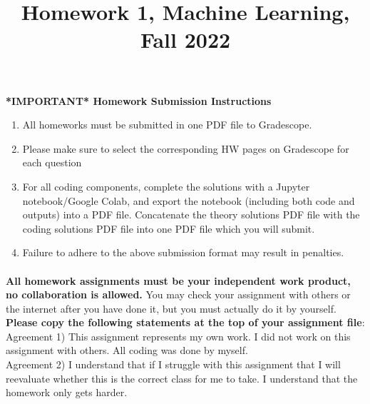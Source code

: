 \documentclass{exam}
\title{Homework 1, Machine Learning, Fall 2022}
\author{ }
\date{}
\begin{document}
\maketitle
\textbf{*IMPORTANT* Homework Submission Instructions}
\begin{enumerate}
    \item All homeworks must be submitted in one PDF file to Gradescope. 
    \item Please make sure to select the corresponding HW pages on Gradescope for each question
    \item For all coding components, complete the solutions with a Jupyter notebook/Google Colab, and export the notebook (including both code and outputs) into a PDF file. Concatenate the theory solutions PDF file with the coding solutions PDF file into one PDF file which you will submit. 
    \item Failure to adhere to the above submission format may result in penalties.  
\end{enumerate}


\paragraph{} \textbf{All homework assignments must be your independent work product, no collaboration is allowed.} You may check your assignment with others or the internet after you have done it, but you must actually do it by yourself. \textbf{Please copy the following statements at the top of your assignment file}: \\

Agreement 1) This assignment represents my own work. I did not work on this assignment with others. All coding was done by myself. \\

Agreement 2) I understand that if I struggle with this assignment that I will reevaluate whether this is the correct class for me to take. I understand that the homework only gets harder.\\\\

\vspace{4in}

\end{document}
